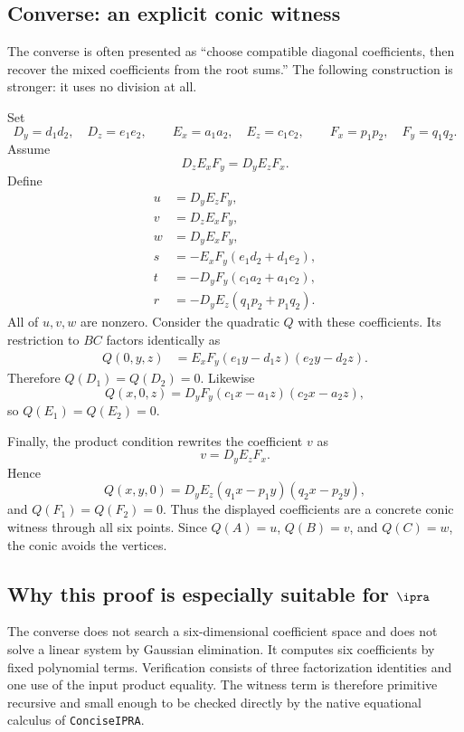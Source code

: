 \subsection{Converse: an explicit conic witness}

The converse is often presented as ``choose compatible diagonal coefficients, then recover the mixed coefficients from the root sums.''  The following construction is stronger: it uses no division at all.

Set
\[
D_y=d_1d_2,\quad D_z=e_1e_2,
\qquad E_x=a_1a_2,\quad E_z=c_1c_2,
\qquad F_x=p_1p_2,\quad F_y=q_1q_2.
\]
Assume
\[
D_zE_xF_y=D_yE_zF_x.
\]
Define
\begin{align*}
u&=D_yE_zF_y,\\
v&=D_zE_xF_y,\\
w&=D_yE_xF_y,\\
s&=-E_xF_y(e_1d_2+d_1e_2),\\
t&=-D_yF_y(c_1a_2+a_1c_2),\\
r&=-D_yE_z(q_1p_2+p_1q_2).
\end{align*}
All of $u,v,w$ are nonzero.  Consider the quadratic $Q$ with these coefficients.  Its restriction to $BC$ factors identically as
\begin{align*}
Q(0,y,z)
&=E_xF_y(e_1y-d_1z)(e_2y-d_2z).
\end{align*}
Therefore $Q(D_1)=Q(D_2)=0$.  Likewise
\[
Q(x,0,z)=D_yF_y(c_1x-a_1z)(c_2x-a_2z),
\]
so $Q(E_1)=Q(E_2)=0$.

Finally, the product condition rewrites the coefficient $v$ as
\[
v=D_yE_zF_x.
\]
Hence
\[
Q(x,y,0)=D_yE_z(q_1x-p_1y)(q_2x-p_2y),
\]
and $Q(F_1)=Q(F_2)=0$.  Thus the displayed coefficients are a concrete conic witness through all six points.  Since $Q(A)=u$, $Q(B)=v$, and $Q(C)=w$, the conic avoids the vertices.

\subsection{Why this proof is especially suitable for \texorpdfstring{$\ipra$}{iPRA}}

The converse does not search a six-dimensional coefficient space and does not solve a linear system by Gaussian elimination.  It computes six coefficients by fixed polynomial terms.  Verification consists of three factorization identities and one use of the input product equality.  The witness term is therefore primitive recursive and small enough to be checked directly by the native equational calculus of \texttt{ConciseIPRA}.
